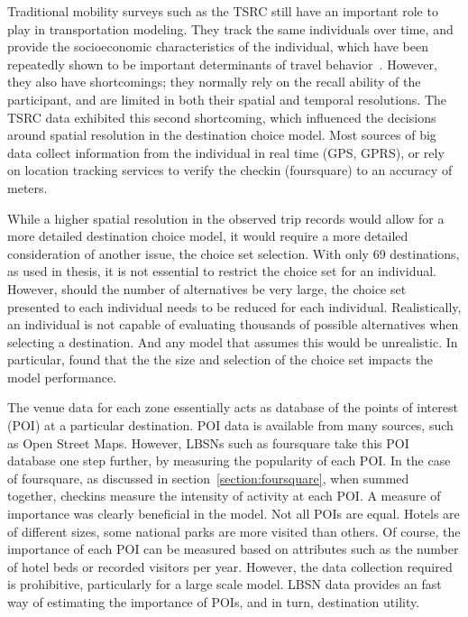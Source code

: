 Traditional mobility surveys such as the TSRC still have an important role to play in transportation modeling. They track the same individuals over time, and provide the socioeconomic characteristics of the individual, which have been repeatedly shown to be important determinants of travel behavior~\parencite{pas1984effect,hanson1982determinants}. However, they also have shortcomings; they normally rely on the recall ability of the participant, and are limited in both their spatial and temporal resolutions. The TSRC data exhibited this second shortcoming, which influenced the decisions around spatial resolution in the destination choice model. Most sources of big data collect information from the individual in real time (GPS, GPRS), or rely on location tracking services to verify the checkin (foursquare) to an accuracy of meters.

While a higher spatial resolution in the observed trip records would allow for a more detailed destination choice model, it would require a more detailed consideration of another issue, the choice set selection. With only 69 destinations, as used in thesis, it is not essential to restrict the choice set for an individual. However, should the number of alternatives be very large, the choice set presented to each individual needs to be reduced for each individual. Realistically, an individual is not capable of evaluating thousands of possible alternatives when selecting a destination. And any model that assumes this would be unrealistic. In particular, \textcite{AkivaLerman85} found that the the size and selection of the choice set impacts the model performance.

The venue data for each zone essentially acts as database of the points of interest (POI) at a particular destination. POI data is available from many sources, such as Open Street Maps. However, LBSNs such as foursquare take this POI database one step further, by measuring the popularity of each POI. In the case of foursquare, as discussed in section~\ref{section:foursquare}, when summed together, checkins measure the intensity of activity at each POI. A measure of importance was clearly beneficial in the model. Not all POIs are equal. Hotels are of different sizes, some national parks are more visited than others. Of course, the importance of each POI can be measured based on attributes such as the number of hotel beds or recorded visitors per year. However, the data collection required is prohibitive, particularly for a large scale model. LBSN data provides an fast way of estimating the importance of POIs, and in turn, destination utility. 

